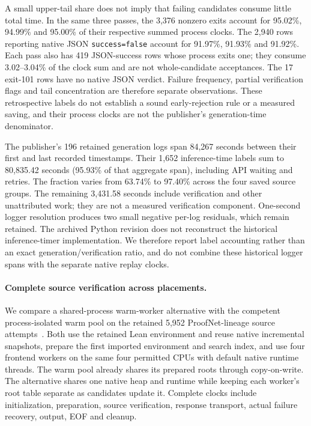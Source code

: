 \documentclass[10pt,twocolumn]{article}
\begin{document}
A small upper-tail share does not imply that failing candidates consume little
total time. In the same three passes, the 3,376 nonzero exits account for
95.02\%, 94.99\% and 95.00\% of their respective summed process clocks.
The 2,940 rows reporting native JSON \texttt{success=false} account for
91.97\%, 91.93\% and 91.92\%. Each pass also has 419 JSON-success rows
whose process exits one; they consume 3.02--3.04\% of the clock sum and are
not whole-candidate acceptances. The 17 exit-101 rows have no native JSON
verdict. Failure frequency, partial verification flags and tail concentration
are therefore separate observations. These retrospective labels do not
establish a sound early-rejection rule or a measured saving, and their
process clocks are not the publisher's generation-time denominator.

The publisher's 196 retained generation logs span 84,267 seconds between their
first and last recorded timestamps. Their 1,652 inference-time labels sum to
80,835.42 seconds (95.93\% of that aggregate span), including API waiting and
retries. The fraction varies from 63.74\% to 97.40\% across the four saved
source groups. The remaining 3,431.58 seconds include verification and other
unattributed work; they are not a measured verification component.
One-second logger resolution produces two small negative per-log residuals,
which remain retained. The archived Python revision does not reconstruct the
historical inference-timer implementation. We therefore report label accounting
rather than an exact generation/verification ratio, and do not combine these
historical logger spans with the separate native replay clocks.

\paragraph{Complete source verification across placements.}
We compare a shared-process warm-worker alternative with the competent
process-isolated warm pool on the retained 5,952 ProofNet-lineage
source attempts~\cite{proofnetSource,goedelProofnet}. Both use the retained Lean environment and reuse native incremental snapshots,
prepare the first imported environment and search index, and use four frontend
workers on the same four permitted CPUs with default native runtime threads.
The warm pool already shares its prepared roots through copy-on-write.
The alternative shares one native heap and runtime while keeping each
worker's root table separate as candidates update it. Complete clocks include initialization,
preparation, source verification, response transport, actual failure recovery,
output, EOF and cleanup.
\end{document}

